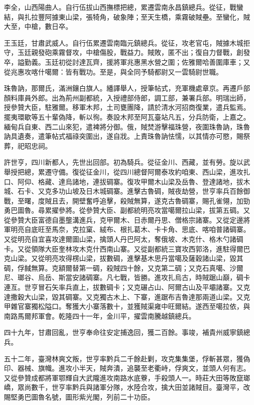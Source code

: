 \begin{pinyinscope}
李全，山西陽曲人。自行伍拔山西撫標把總，累遷雲南永昌鎮總兵。從征，戰蠻結，與扎拉豐阿據東山梁，張犄角，破象陣；至天生橋，乘霧破賊壘。至蠻化，賊大至，中槍，數日卒。

王玉廷，甘肅武威人。自行伍累遷雲南臨元鎮總兵。從征，攻老官屯，賊據木城拒守，玉廷親發砲乘霧督攻，中槍傷股，戰益力。賊敗，匿不出；復自力督戰，創發卒，謚勤義。玉廷初從討達瓦齊，援將軍兆惠黑水營之圍；佐雅爾哈善圍庫車；又從兆惠攻喀什噶爾：皆有戰功。至是，與全同予騎都尉又一雲騎尉世職。

珠魯訥，那爾氏，滿洲鑲白旗人。繙譯舉人，授筆帖式，充軍機處章京。再遷戶部顏料庫員外郎。出為荊州副都統，入授禮部侍郎，調工部，兼署兵部。明瑞出師，授參贊大臣，駐雅爾。移軍木邦，土司甕團降，請於清水河招商復業，遣兵監焉。擺夷環歇等五十輩偽降，斬以徇。奏設木邦至阿瓦臺站凡五，分兵防衛，上嘉之。緬甸兵自東、西二山來犯，遣裨將分御。俄，賊焚游擊福珠營，夜圍珠魯訥，珠魯訥具遺奏，遣筆帖式福祿突圍出，遂自戕。上責珠魯訥怯懦，以其情亦可愍，賜祭葬，祀昭忠祠。

許世亨，四川新都人，先世出回部。初為騎兵。從征金川、西藏，並有勞。旋以武舉授把總，累遷守備。復從征金川，從四川總督阿爾泰攻約咱東、西山梁，進攻扎口、阿仰、格藏、達烏諸地，連拔碉寨。復攻甲爾木山梁及岳魯、登達諸地，拔木城、石卡、又克多功山坡及日木城碉寨。進擊古魯碉，賊夜劫營，世亨率兵百餘御戰，至曙，度賊且去，開壁奮呼追擊，殺賊無算，遂克古魯碉寨，賜孔雀翎，加勁勇巴圖魯。尋累擢參將。從參贊大臣、副都統明亮攻當噶爾拉山梁，拔第五碉。又從參贊大臣富德自墨壟溝進兵，克甲爾木、日赤爾丹思、僧格宗諸寨。又從定邊將軍明亮自底旺至馬奈，克拉窠、絨布、根扎葛木、卡卡角、思底、喀咱普諸碉寨。又從明亮自宜喜攻達爾圖山梁，擒頭人丹巴阿太，奪俄坡、木克什、格木勺諸碉卡。又從領隊大臣奎林攻木克什西南山寨。又從副都統三寶攻西郭洛，進駐得爾巴克山梁。又從明亮攻得楞山梁，拔數碉，進擊基木思丹當噶及薩穀諸山梁，毀其碉，俘馘無算。克額爾替第一碉，殺賊四十餘，又克第二碉；又克石真噶、沙爾尼、瑯谷、烏岳、斯當安諸碉寨。凡七戰，皆勝。進攻扎烏古，時賊踞山巔，碉卡連亙。世亨冒石矢率兵直上，拔數碉卡；又克碾占山、阿爾古山及平壩諸寨。又克達撒穀大山梁，毀其碉寨。又克獨古木上、下寨，進踞布吉魯達那兩道山梁。又克甲雜官寨獨松隘口。奪獲大小寨落數十，並獲賊渠雍中旺爾結。遂西至噶拉依，與南路馬爾邦軍會。乾隆四十一年，金川平，擢雲南騰越鎮總兵。

四十九年，甘肅回亂，世亨奉命往安定捕逸回，獲二百餘。事竣，補貴州威寧鎮總兵。

五十二年，臺灣林爽文叛，世亨率黔兵二千餘赴剿，攻克集集堡，俘斬甚眾，獲偽印、器械、旗幟。進攻小半天，賊奔潰，追襲至老衢峙，俘爽文，並頭人何有志。又從參贊成都將軍鄂輝自大武隴進攻南路水底藔，手殺頭人一。時莊大田等敗竄瑯嶠，眾尚數千，世亨率黔兵與諸軍分隊，水陸合攻，擒大田並諸賊目。臺灣平，改賜堅勇巴圖魯名號，圖形紫光閣，列前二十功臣。


\end{pinyinscope}
